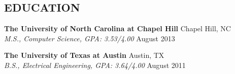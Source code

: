 \documentclass[line,margin,letterpaper]{res}
\begin{document}
\address{+51 987 804 617 - alfredo@miranda.io - https://miranda.io}

\begin{resume}

\section{EDUCATION}
  {\bf The University of North Carolina at Chapel Hill}
  \hfill Chapel Hill, NC \\
  \emph{M.S., Computer Science, GPA: 3.53/4.00} \hfill August 2013

  {\bf The University of Texas at Austin} \hfill Austin, TX \\
  \emph{B.S., Electrical Engineering, GPA: 3.64/4.00} \hfill  August 2011


\end{resume}
\end{document}
